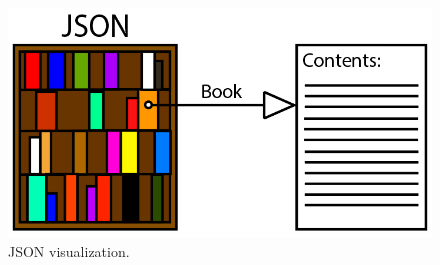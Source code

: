 \documentclass[11pt]{article}
\begin{document}
{		\begin{figure}[htbp]
			\centerline{\includegraphics[scale=0.45]{Diagrams/Diagram1}}
			\caption{JSON visualization.}
		\end{figure}
		
}
\end{document}
